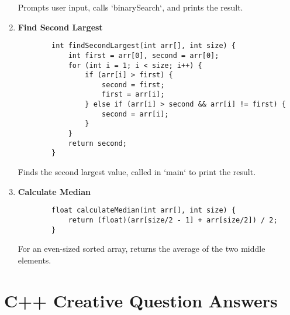 \documentclass[a4paper,12pt]{article}
\begin{document}
\begin{enumerate}
    Prompts user input, calls `binarySearch`, and prints the result.

    \item \textbf{Find Second Largest}

    \lstset{language=C}
    \begin{lstlisting}
        int findSecondLargest(int arr[], int size) {
            int first = arr[0], second = arr[0];
            for (int i = 1; i < size; i++) {
                if (arr[i] > first) {
                    second = first;
                    first = arr[i];
                } else if (arr[i] > second && arr[i] != first) {
                    second = arr[i];
                }
            }
            return second;
        }
    \end{lstlisting}

    Finds the second largest value, called in `main` to print the result.

    \item \textbf{Calculate Median}

    \lstset{language=C}
    \begin{lstlisting}
        float calculateMedian(int arr[], int size) {
            return (float)(arr[size/2 - 1] + arr[size/2]) / 2;
        }
    \end{lstlisting}

    For an even-sized sorted array, returns the average of the two middle elements.
\end{enumerate}

\section{C++ Creative Question Answers}
\end{document}
